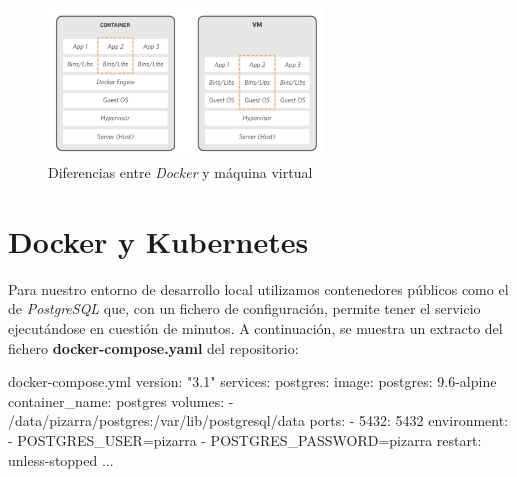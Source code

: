 \documentclass[11pt,spanish,listoffigures,listoftables]{tfgetsinf}
\begin{document}
\begin{figure}[ht]
	\centering
	\includegraphics[width=0.65\textwidth]{img/container-vs-vm}
	\caption[Diferencias entre \textit{Docker} y máquina virtual]{Diferencias entre \textit{Docker} y máquina virtual}
	\label{figura:container-vs-vm}
\end{figure}

\section{Docker y Kubernetes}

Para nuestro entorno de desarrollo local utilizamos \gls{contenedor}es públicos como el de \textit{PostgreSQL} que, con un fichero de configuración, permite tener el servicio ejecutándose en cuestión de minutos. A continuación, se muestra un extracto del fichero \textbf{docker-compose.yaml} del repositorio: 
\newline

\begin{code}{docker-compose.yml}
version: "3.1"
services:
  postgres:
    image: postgres: 9.6-alpine
    container_name: postgres
    volumes:
      - /data/pizarra/postgres:/var/lib/postgresql/data
    ports:
      - 5432: 5432
    environment:
      - POSTGRES_USER=pizarra
      - POSTGRES_PASSWORD=pizarra
    restart: unless-stopped
...
\end{code}
\end{document}

